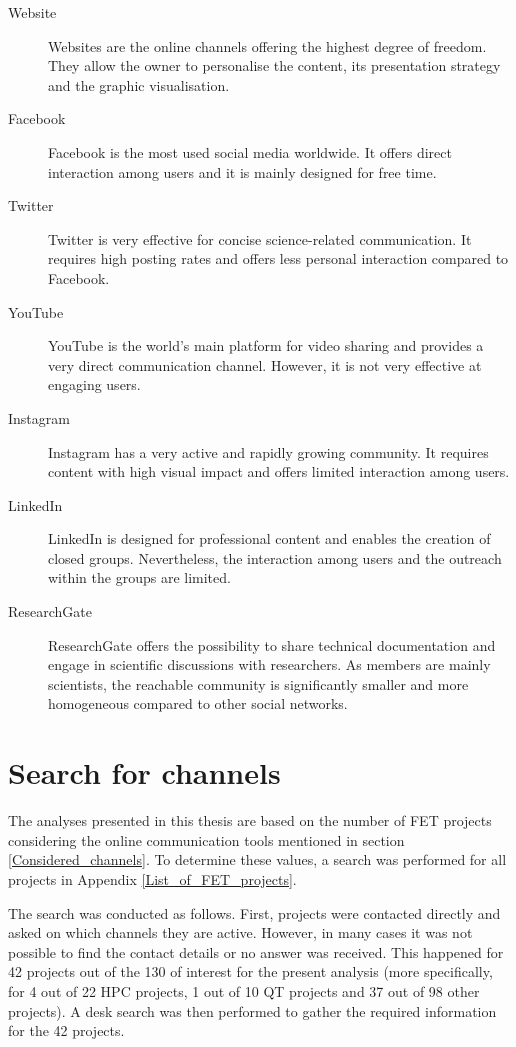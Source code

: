 \begin{description}
 \item [Website] Websites are the online channels offering the highest degree of freedom. They allow the owner to personalise the content, its presentation strategy and the graphic visualisation.
 \item [Facebook] Facebook is the most used social media worldwide. It offers direct interaction among users and it is mainly designed for free time.  
 \item [Twitter] Twitter is very effective for concise science-related communication. It requires high posting rates and offers less personal interaction compared to Facebook.
 \item [YouTube] YouTube is the world's main platform for video sharing and provides a very direct communication channel. However, it is not very effective at engaging users.
 \item [Instagram] Instagram has a very active and rapidly growing community. It requires content with high visual impact and offers limited interaction among users.
 \item [LinkedIn] LinkedIn is designed for professional content and enables the creation of closed groups. Nevertheless, the interaction among users and the outreach within the groups are limited.
 \item [ResearchGate] ResearchGate offers the possibility to share technical documentation and engage in scientific discussions with researchers. As members are mainly scientists, the reachable community is significantly smaller and more homogeneous compared to other social networks.  
\end{description}

\section{Search for channels} \label{Search_for_channels}
The analyses presented in this thesis are based on the number of FET projects considering the online communication tools mentioned in section \ref{Considered_channels}. To determine these values, a search was performed for all projects in Appendix \ref{List_of_FET_projects}. 

The search was conducted as follows. First, projects were contacted directly and asked on which channels they are active. However, in many cases it was not possible to find the contact details or no answer was received. This happened for 42 projects out of the 130 of interest for the present analysis (more specifically, for 4 out of 22 HPC projects, 1 out of 10 QT projects and 37 out of 98 other projects). A desk search was then performed to gather the required information for the 42 projects. 

